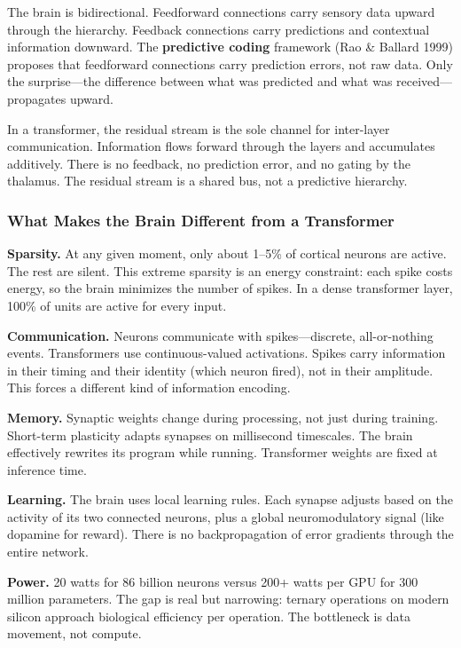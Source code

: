 \documentclass[11pt,a4paper]{article}
\begin{document}
The brain is bidirectional. Feedforward connections carry sensory data upward through the hierarchy. Feedback connections carry predictions and contextual information downward. The \textbf{predictive coding} framework (Rao \& Ballard 1999) proposes that feedforward connections carry prediction errors, not raw data. Only the surprise---the difference between what was predicted and what was received---propagates upward.

In a transformer, the residual stream is the sole channel for inter-layer communication. Information flows forward through the layers and accumulates additively. There is no feedback, no prediction error, and no gating by the thalamus. The residual stream is a shared bus, not a predictive hierarchy.

\subsubsection{What Makes the Brain Different from a Transformer}

\textbf{Sparsity.} At any given moment, only about 1--5\% of cortical neurons are active. The rest are silent. This extreme sparsity is an energy constraint: each spike costs energy, so the brain minimizes the number of spikes. In a dense transformer layer, 100\% of units are active for every input.

\textbf{Communication.} Neurons communicate with spikes---discrete, all-or-nothing events. Transformers use continuous-valued activations. Spikes carry information in their timing and their identity (which neuron fired), not in their amplitude. This forces a different kind of information encoding.

\textbf{Memory.} Synaptic weights change during processing, not just during training. Short-term plasticity adapts synapses on millisecond timescales. The brain effectively rewrites its program while running. Transformer weights are fixed at inference time.

\textbf{Learning.} The brain uses local learning rules. Each synapse adjusts based on the activity of its two connected neurons, plus a global neuromodulatory signal (like dopamine for reward). There is no backpropagation of error gradients through the entire network.

\textbf{Power.} 20 watts for 86 billion neurons versus 200+ watts per GPU for 300 million parameters. The gap is real but narrowing: ternary operations on modern silicon approach biological efficiency per operation. The bottleneck is data movement, not compute.
\end{document}
